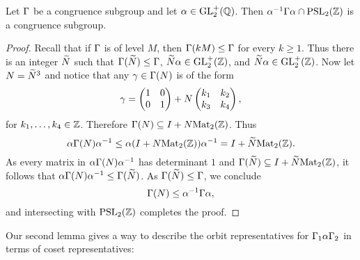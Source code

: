       \begin{lemma}\label{lem:coset_lemma_1}
        Let $\Gamma$ be a congruence subgroup and let $\alpha \in \mathrm{GL}_{2}^{+}(\mathbb{Q})$. Then $\alpha^{-1}\Gamma\alpha \cap \mathrm{PSL}_{2}(\mathbb{Z})$ is a congruence subgroup.
      \end{lemma}
      \begin{proof}
        Recall that if $\Gamma$ is of level $M$, then $\Gamma(kM) \le \Gamma$ for every $k \ge 1$. Thus there is an integer $\widetilde{N}$ such that $\Gamma(\widetilde{N}) \le \Gamma$, $\widetilde{N}\alpha \in \mathrm{GL}_{2}^{+}(\mathbb{Z})$, and $\widetilde{N}\alpha \in \mathrm{GL}_{2}^{+}(\mathbb{Z})$. Now let $N = \widetilde{N}^{3}$ and notice that any $\gamma \in \Gamma(N)$ is of the form
        \[
          \gamma = \begin{pmatrix} 1 & 0 \\ 0 & 1 \end{pmatrix}+N\begin{pmatrix} k_{1} & k_{2} \\ k_{3} & k_{4} \end{pmatrix},
        \]
        for $k_{1},\ldots,k_{4} \in \mathbb{Z}$. Therefore $\Gamma(N) \subseteq I+N\mathrm{Mat}_{2}(\mathbb{Z})$. Thus
        \[
          \alpha\Gamma(N)\alpha^{-1} \le \alpha(I+N\mathrm{Mat}_{2}(\mathbb{Z}))\alpha^{-1} = I+\widetilde{N}\mathrm{Mat}_{2}(\mathbb{Z}).
        \]
        As every matrix in $\alpha\Gamma(N)\alpha^{-1}$ has determinant $1$ and $\Gamma(\widetilde{N}) \subseteq I+\widetilde{N}\mathrm{Mat}_{2}(\mathbb{Z})$, it follows that $\alpha\Gamma(N)\alpha^{-1} \le \Gamma(\widetilde{N})$. As $\Gamma(\widetilde{N}) \le \Gamma$, we conclude
        \[
          \Gamma(N) \le \alpha^{-1}\Gamma\alpha,
        \]
        and intersecting with $\mathrm{PSL}_{2}(\mathbb{Z})$ completes the proof.
      \end{proof}

      Our second lemma gives a way to describe the orbit representatives for $\Gamma_{1}\alpha\Gamma_{2}$ in terms of coset representatives:

